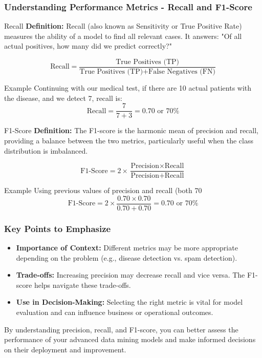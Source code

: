 \documentclass{beamer}
\begin{document}
\begin{frame}[fragile]
    \frametitle{Understanding Performance Metrics - Recall and F1-Score}
    \begin{block}{Recall}
        \textbf{Definition:} Recall (also known as Sensitivity or True Positive Rate) measures the ability of a model to find all relevant cases. It answers: "Of all actual positives, how many did we predict correctly?"
    \end{block}
    \begin{equation}
        \text{Recall} = \frac{\text{True Positives (TP)}}{\text{True Positives (TP)} + \text{False Negatives (FN)}}
    \end{equation}
    \begin{block}{Example}
        Continuing with our medical test, if there are 10 actual patients with the disease, and we detect 7, recall is:
        \begin{equation}
            \text{Recall} = \frac{7}{7 + 3} = 0.70 \text{ or } 70\%
        \end{equation}
    \end{block}

    \begin{block}{F1-Score}
        \textbf{Definition:} The F1-score is the harmonic mean of precision and recall, providing a balance between the two metrics, particularly useful when the class distribution is imbalanced.
    \end{block}
    \begin{equation}
        \text{F1-Score} = 2 \times \frac{\text{Precision} \times \text{Recall}}{\text{Precision} + \text{Recall}}
    \end{equation}
    \begin{block}{Example}
        Using previous values of precision and recall (both 70%
        \begin{equation}
            \text{F1-Score} = 2 \times \frac{0.70 \times 0.70}{0.70 + 0.70} = 0.70 \text{ or } 70\%
        \end{equation}
    \end{block}
\end{frame}

\begin{frame}[fragile]
    \frametitle{Key Points to Emphasize}
    \begin{itemize}
        \item \textbf{Importance of Context:} Different metrics may be more appropriate depending on the problem (e.g., disease detection vs. spam detection).
        \item \textbf{Trade-offs:} Increasing precision may decrease recall and vice versa. The F1-score helps navigate these trade-offs.
        \item \textbf{Use in Decision-Making:} Selecting the right metric is vital for model evaluation and can influence business or operational outcomes.
    \end{itemize}
    By understanding precision, recall, and F1-score, you can better assess the performance of your advanced data mining models and make informed decisions on their deployment and improvement.
\end{frame}
\end{document}
